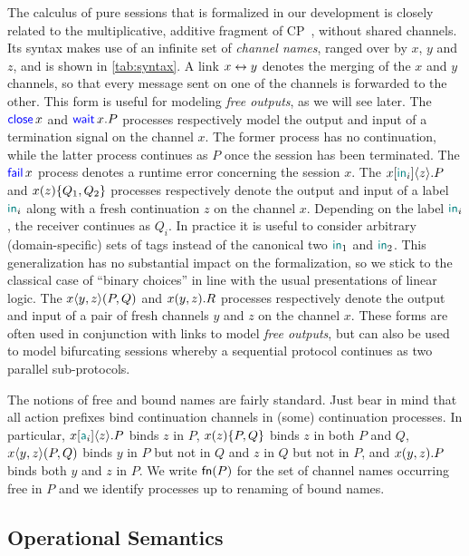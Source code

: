 The calculus of pure sessions that is formalized in our development is closely
related to the multiplicative, additive fragment of CP~\citep{Wadler14}, without
shared channels. Its syntax makes use of an infinite set of \emph{channel
names}, ranged over by $x$, $y$ and $z$, and is shown in \cref{tab:syntax}.
%
A link $x\leftrightarrow y$ denotes the merging of the $x$ and $y$ channels, so that
every message sent on one of the channels is forwarded to the other. This form
is useful for modeling \emph{free outputs}, as we will see later.
%
The $\mathsf{\color{blue}close}\,x$ and $\mathsf{\color{blue}wait}\,x.P$ processes respectively model the output and input
of a termination signal on the channel $x$. The former process has no
continuation, while the latter process continues as $P$ once the session has
been terminated.
%
The $\mathsf{\color{blue}fail}\,x$ process denotes a runtime error concerning the session $x$.
%
The $\Select\x{\InTag_i}\z.P$ and $\Case\x\z{Q_1}{Q_2}$ processes respectively
denote the output and input of a label $\mathsf{\color{teal}in}_i$ along with a fresh
continuation $z$ on the channel $x$. Depending on the label $\mathsf{\color{teal}in}_i$, the
receiver continues as $Q_i$. In practice it is useful to consider arbitrary
(domain-specific) sets of tags instead of the canonical two $\mathsf{\color{teal}in}_1$ and
$\mathsf{\color{teal}in}_2$. This generalization has no substantial impact on the formalization,
so we stick to the classical case of ``binary choices'' in line with the usual
presentations of linear logic.
%
The $\Fork\x\y\z{P}{Q}$ and $\Join\x\y\z.R$ processes respectively denote the
output and input of a pair of fresh channels $y$ and $z$ on the channel $x$.
These forms are often used in conjunction with links to model \emph{free
outputs}, but can also be used to model bifurcating sessions whereby a
sequential protocol continues as two parallel sub-protocols.

The notions of free and bound names are fairly standard. Just bear in mind that
all action prefixes bind continuation channels in (some) continuation processes.
In particular, $\Select\x{\Tag_i}\z.P$ binds $z$ in $P$, $\Case\x\z{P}{Q}$ binds
$z$ in both $P$ and $Q$, $\Fork\x\y\z{P}{Q}$ binds $y$ in $P$ but not in $Q$ and
$z$ in $Q$ but not in $P$, and $\Join\x\y\z.P$ binds both $y$ and $z$ in $P$.
%
We write $\mathsf{fn}(P)$ for the set of channel names occurring free in $P$ and we
identify processes up to renaming of bound names.

\subsection{Operational Semantics}
\label{sec:semantics}

